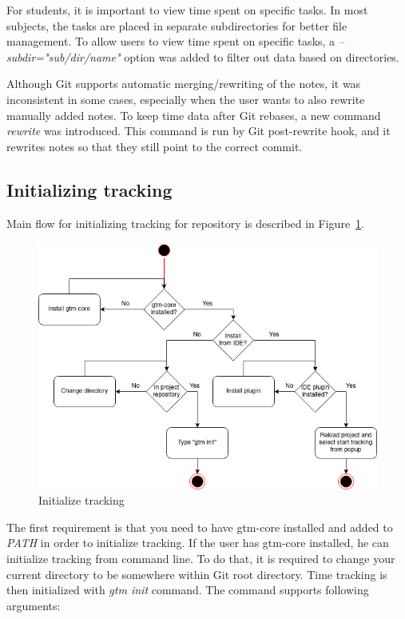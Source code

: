 For students, it is important to view time spent on specific tasks.
In most subjects, the tasks are placed in separate subdirectories for better file management.
To allow users to view time spent on specific tasks, a \textit{--subdir="sub/dir/name"} option was added to filter out
data based on directories.

Although Git supports automatic merging/rewriting of the notes, it was inconsistent in some cases, especially when the user
wants to also rewrite manually added notes.
To keep time data after Git rebases, a new command \textit{rewrite} was introduced.
This command is run by Git post-rewrite hook, and it rewrites notes so that they still point to the correct commit.

\subsection{Initializing tracking}\label{subsec:init-tracking}
Main flow for initializing tracking for repository is described in Figure~\ref{fig:init-tracking}.
\begin{figure}[h]
    \includegraphics[width=\textwidth]{figures/init_tracking}
    \caption{Initialize tracking}
    \label{fig:init-tracking}
\end{figure}

The first requirement is that you need to have gtm-core installed and added to \textit{PATH} in order to initialize tracking.
If the user has gtm-core installed, he can initialize tracking from command line.
To do that, it is required to change your current directory to be somewhere within Git root directory.
Time tracking is then initialized with \textit{gtm init} command.
The command supports following arguments:

